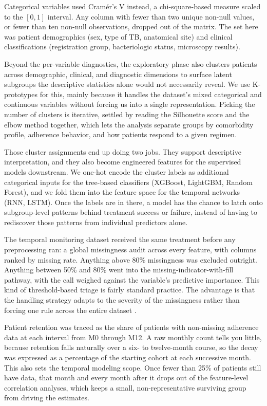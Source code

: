\documentclass[12pt]{article}
\renewcommand{\_}{\textunderscore\allowbreak}
\begin{document}
Categorical variables used Cram\'{e}r's V instead, a chi-square-based measure scaled to the \([0, 1]\) interval. Any column with fewer than two unique non-null values, or fewer than ten non-null observations, dropped out of the matrix. The set here was patient demographics (sex, type of TB, anatomical site) and clinical classifications (registration group, bacteriologic status, microscopy results).

Beyond the per-variable diagnostics, the exploratory phase also clusters patients across demographic, clinical, and diagnostic dimensions to surface latent subgroups the descriptive statistics alone would not necessarily reveal. We use K-prototypes for this, mainly because it handles the dataset's mixed categorical and continuous variables without forcing us into a single representation. Picking the number of clusters is iterative, settled by reading the Silhouette score and the elbow method together, which lets the analysis separate groups by comorbidity profile, adherence behavior, and how patients respond to a given regimen.

Those cluster assignments end up doing two jobs. They support descriptive interpretation, and they also become engineered features for the supervised models downstream. We one-hot encode the cluster labels as additional categorical inputs for the tree-based classifiers (XGBoost, LightGBM, Random Forest), and we fold them into the feature space for the temporal networks (RNN, LSTM). Once the labels are in there, a model has the chance to latch onto subgroup-level patterns behind treatment success or failure, instead of having to rediscover those patterns from individual predictors alone.

The temporal monitoring dataset received the same treatment before any preprocessing ran: a global missingness audit across every feature, with columns ranked by missing rate. Anything above 80\% missingness was excluded outright. Anything between 50\% and 80\% went into the missing-indicator-with-fill pathway, with the call weighed against the variable's predictive importance. This kind of threshold-based triage is fairly standard practice. The advantage is that the handling strategy adapts to the severity of the missingness rather than forcing one rule across the entire dataset \citep{ref31}.

Patient retention was traced as the share of patients with non-missing adherence data at each interval from M0 through M12. A raw monthly count tells you little, because retention falls naturally over a six- to twelve-month course, so the decay was expressed as a percentage of the starting cohort at each successive month. This also sets the temporal modeling scope. Once fewer than 25\% of patients still have data, that month and every month after it drops out of the feature-level correlation analyses, which keeps a small, non-representative surviving group from driving the estimates.
\end{document}
